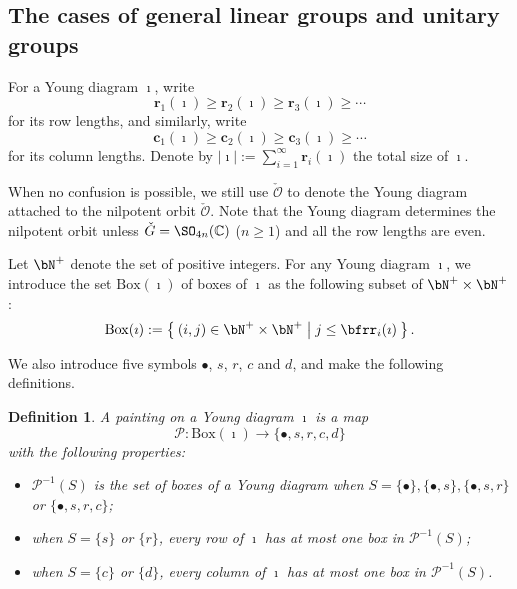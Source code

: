\documentclass[12pt,a4paper]{amsart}
\def\abs#1{\left|{#1}\right|}
\newcommand{\CO}{{\mathcal {O}}}
\newcommand{\CP}{{\mathcal {P}}}
\numberwithin{equation}{section}
\newtheorem{defn}[thm]{Definition}
\theoremstyle{remark}
\def\CP{\mathsf{CP}}
\begin{document}
\subsection{The cases of general linear groups and unitary groups}


  For a Young diagram $\imath$, write
 \[
   \mathbf r_1(\imath)\geq \mathbf r_2(\imath)\geq \mathbf r_3(\imath)\geq \cdots
 \]
 for its row lengths, and similarly, write
 \[
   \mathbf c_1(\imath)\geq \mathbf c_2(\imath)\geq \mathbf c_3(\imath)\geq \cdots
 \]
 for its column lengths. Denote by
 $\abs{\imath}:=\sum_{i=1}^\infty \mathbf r_i(\imath)$ the total size of
 $\imath$.


When no confusion is possible, we still use $\check \CO$ to denote the Young diagram attached to the nilpotent orbit $\check \CO$. Note that the Young diagram determines the nilpotent orbit unless $\check G=\SO_{4n}(\C)$ ($n\geq 1$) and all the row lengths are even.

Let $\bN^+$ denote the set of positive integers. For any Young diagram $\imath$, we introduce the set $\mathrm{Box}(\imath)$ of
boxes of $\imath$ as the following subset of $\bN^+\times \bN^+$:
\begin{equation}\label{eq:BOX}
  \mathrm{Box}(\imath):=\Set{(i,j)\in\bN^+\times \bN^+| j\leq \bfrr_i(\imath)}.
\end{equation}


\renewcommand{\CP}{\mathcal{P}} We also introduce five symbols $\bullet$, $s$,
$r$, $c$ and $d$, and make the following definitions.
\begin{defn}
  A painting on a Young diagram $\imath$ is a map
  \[
    \mathcal P: \mathrm{Box}(\imath) \rightarrow \{\bullet, s, r, c, d \}
  \]
  with the following properties:
  \begin{itemize}
    \item $\mathcal P^{-1}(S)$ is the set of boxes of a Young diagram when
          $S=\{\bullet\}, \{\bullet, s \}, \{\bullet, s, r\}$ or
          $\{\bullet, s, r, c \} $;
    \item when $S=\{s\}$ or $ \{r\}$, every row of $\imath$ has at most one box
          in $\CP^{-1}(S)$;
    \item when $S=\{c\}$ or $ \{d \}$, every column of $\imath$ has at most one
          box in $\CP^{-1}(S)$.
  \end{itemize}
\end{defn}
\end{document}
